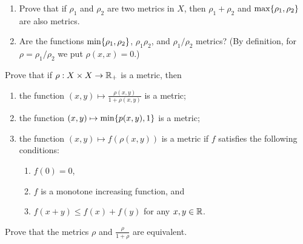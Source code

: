\begin{minorEx}
    \begin{enumerate}
        \item Prove that if $\rho_1$ and $\rho_2$ are two metrics in $X$, then
            $\rho_1 + \rho_2$ and $\max \{\rho_1, \rho_2\}$ are also metrics.
        \item Are the functions $\min\{\rho_1, \rho_2\}$, $\rho_1 \rho_2$, and
            $\rho_1 / \rho_2$ metrics? (By definition, for $\rho = \rho_1 /
            \rho_2$ we put $\rho(x, x) = 0$.)
    \end{enumerate}
\end{minorEx}

\begin{minorEx}
    Prove that if $\rho : X \times X \to \mathbb{R}_+$ is a metric, then
    \begin{enumerate}
        \item the function $(x, y) \mapsto \frac{\rho(x,y)}{1 + \rho(x,y)}$ is a
            metric;
        \item the function $(x, y) \mapsto \min\{p(x,y), 1\}$ is a metric;
        \item the function $(x, y) \mapsto f(\rho(x,y))$ is a metric if $f$
            satisfies the following conditions:
            \begin{enumerate}
                \item $f(0) = 0$,
                \item $f$ is a monotone increasing function, and
                \item $f(x + y) \leq f(x) + f(y)$ for any $x, y \in \mathbb{R}$.
            \end{enumerate}
    \end{enumerate}
\end{minorEx}

\begin{minorEx}
    Prove that the metrics $\rho$ and $\frac{\rho}{1 + \rho}$ are equivalent.
\end{minorEx}
